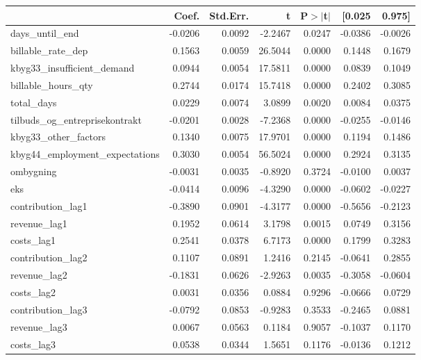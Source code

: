 \begin{table}
\begin{center}
\begin{tabular}{lrrrrrr}
\hline
                                 &   Coef. & Std.Err. &       t & P$> |$t$|$ &  [0.025 &  0.975]  \\
\hline
days\_until\_end                 & -0.0206 &   0.0092 & -2.2467 &      0.0247 & -0.0386 & -0.0026  \\
billable\_rate\_dep              &  0.1563 &   0.0059 & 26.5044 &      0.0000 &  0.1448 &  0.1679  \\
kbyg33\_insufficient\_demand     &  0.0944 &   0.0054 & 17.5811 &      0.0000 &  0.0839 &  0.1049  \\
billable\_hours\_qty             &  0.2744 &   0.0174 & 15.7418 &      0.0000 &  0.2402 &  0.3085  \\
total\_days                      &  0.0229 &   0.0074 &  3.0899 &      0.0020 &  0.0084 &  0.0375  \\
tilbuds\_og\_entreprisekontrakt  & -0.0201 &   0.0028 & -7.2368 &      0.0000 & -0.0255 & -0.0146  \\
kbyg33\_other\_factors           &  0.1340 &   0.0075 & 17.9701 &      0.0000 &  0.1194 &  0.1486  \\
kbyg44\_employment\_expectations &  0.3030 &   0.0054 & 56.5024 &      0.0000 &  0.2924 &  0.3135  \\
ombygning                        & -0.0031 &   0.0035 & -0.8920 &      0.3724 & -0.0100 &  0.0037  \\
eks                              & -0.0414 &   0.0096 & -4.3290 &      0.0000 & -0.0602 & -0.0227  \\
contribution\_lag1               & -0.3890 &   0.0901 & -4.3177 &      0.0000 & -0.5656 & -0.2123  \\
revenue\_lag1                    &  0.1952 &   0.0614 &  3.1798 &      0.0015 &  0.0749 &  0.3156  \\
costs\_lag1                      &  0.2541 &   0.0378 &  6.7173 &      0.0000 &  0.1799 &  0.3283  \\
contribution\_lag2               &  0.1107 &   0.0891 &  1.2416 &      0.2145 & -0.0641 &  0.2855  \\
revenue\_lag2                    & -0.1831 &   0.0626 & -2.9263 &      0.0035 & -0.3058 & -0.0604  \\
costs\_lag2                      &  0.0031 &   0.0356 &  0.0884 &      0.9296 & -0.0666 &  0.0729  \\
contribution\_lag3               & -0.0792 &   0.0853 & -0.9283 &      0.3533 & -0.2465 &  0.0881  \\
revenue\_lag3                    &  0.0067 &   0.0563 &  0.1184 &      0.9057 & -0.1037 &  0.1170  \\
costs\_lag3                      &  0.0538 &   0.0344 &  1.5651 &      0.1176 & -0.0136 &  0.1212  \\
\hline
\end{tabular}
\end{center}


\end{table}
